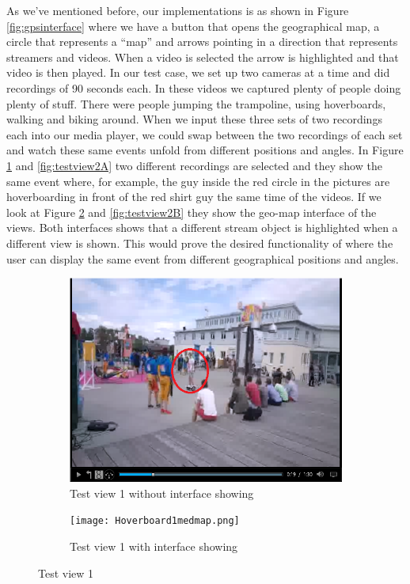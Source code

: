 As we’ve mentioned before, our implementations is as shown in Figure \ref{fig:gpsinterface} where we have a button that opens the geographical map, a circle that represents a “map” and arrows pointing in a direction that represents streamers and videos. When a video is selected the arrow is highlighted and that video is then played. In our test case, we set up two cameras at a time and did recordings of 90 seconds each. In these videos we captured plenty of people doing plenty of stuff. There were people jumping the trampoline, using hoverboards, walking and biking around. When we input these three sets of two recordings each into our media player, we could swap between the two recordings of each set and watch these same events unfold from different positions and angles. In Figure \ref{fig:testview1A} and \ref{fig:testview2A} two different recordings are selected and they show the same event where, for example, the guy inside the red circle in the pictures are hoverboarding in front of the red shirt guy the same time of the videos. If we look at Figure \ref{fig:testview1B} and \ref{fig:testview2B} they show the geo-map interface of the views. Both interfaces shows that a different stream object is highlighted when a different view is shown. This would prove the desired functionality of where the user can display the same event from different geographical positions and angles.

\begin{figure}
\begin{subfigure}[b]{0.5\textwidth}
 	\includegraphics[width=\linewidth]{Hoverboard_1.png}
  	\caption{Test view 1 without interface showing}\label{fig:testview1A}
    \end{subfigure}\hfill 
    \hspace{3px}
    \begin{subfigure}[b]{0.5\textwidth}
	\texttt{[image: Hoverboard1medmap.png]}
  	\caption{Test view 1 with interface showing}\label{fig:testview1B}
    \end{subfigure}
	\caption{Test view 1}
	\label{fig:testview1}
\end{figure}

